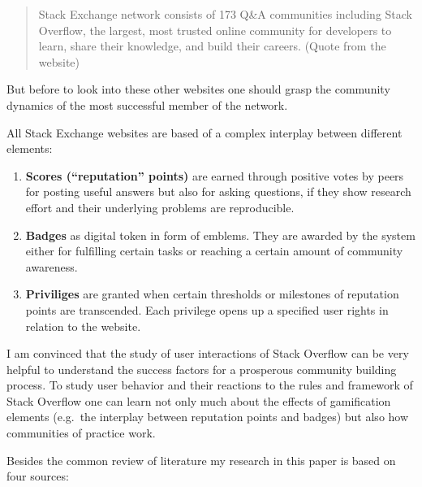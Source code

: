 \documentclass[]{book}
\providecommand{\tightlist}{%
  \setlength{\itemsep}{0pt}\setlength{\parskip}{0pt}}
\theoremstyle{definition}
\theoremstyle{definition}
\theoremstyle{definition}
\theoremstyle{remark}
\begin{document}
\begin{quote}
Stack Exchange network consists of 173 Q\&A communities including Stack
Overflow, the largest, most trusted online community for developers to
learn, share their knowledge, and build their careers. (Quote from the
website)
\end{quote}

But before to look into these other websites one should grasp the
community dynamics of the most successful member of the network.

All Stack Exchange websites are based of a complex interplay between
different elements:

\begin{enumerate}
\def\labelenumi{\arabic{enumi}.}
\tightlist
\item
  \textbf{Scores (``reputation'' points)} are earned through positive
  votes by peers for posting useful answers but also for asking
  questions, if they show research effort and their underlying problems
  are reproducible.
\item
  \textbf{Badges} as digital token in form of emblems. They are awarded
  by the system either for fulfilling certain tasks or reaching a
  certain amount of community awareness.
\item
  \textbf{Priviliges} are granted when certain thresholds or milestones
  of reputation points are transcended. Each privilege opens up a
  specified user rights in relation to the website.
\end{enumerate}

I am convinced that the study of user interactions of Stack Overflow can
be very helpful to understand the success factors for a prosperous
community building process. To study user behavior and their reactions
to the rules and framework of Stack Overflow one can learn not only much
about the effects of gamification elements (e.g.~the interplay between
reputation points and badges) but also how communities of practice work.

Besides the common review of literature my research in this paper is
based on four sources:
\end{document}
